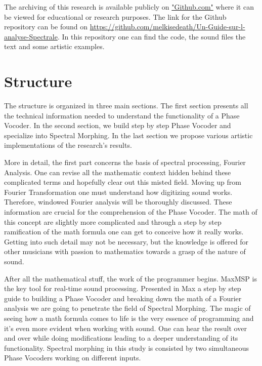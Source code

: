 The archiving of this research is available publicly on \href{https://github.com/}{"Github.com"} where it can be viewed for educational or research purposes. The link for the Github repository can be found on \href{https://github.com/melkisedeath/Un-Guide-sur-l-analyse-Spectrale}{https://github.com/melkisedeath/Un-Guide-sur-l-analyse-Spectrale}. In this repository one can find the code, the sound files the text and some artistic examples.


\section{Structure}

The structure is organized in three main sections. The first section presents all the technical information needed to understand the functionality of a Phase Vocoder. In the second section, we build step by step Phase Vocoder and specialize into Spectral Morphing. In the last section we propose various artistic implementations of the research's results.

More in detail, the first part concerns the basis of spectral processing, Fourier Analysis. One can revise all the mathematic context hidden behind these complicated terms and hopefully clear out this misted field. Moving up from Fourier Transformation one must understand how digitizing sound works. Therefore, windowed Fourier analysis will be thoroughly discussed. These information are crucial for the comprehension of the Phase Vocoder. The math of this concept are slightly more complicated and through a step by step ramification of the math formula one can get to conceive how it really works. Getting into such detail may not be necessary, but the knowledge is offered for other musicians with passion to mathematics towards a grasp of the nature of sound.

After all the mathematical stuff, the work of the programmer begins. MaxMSP is the key tool for real-time sound processing. Presented in Max a step by step guide to building a Phase Vocoder and breaking down the math of a Fourier analysis we are going to penetrate the field of Spectral Morphing. The magic of seeing how a math formula comes to life is the very essence of programming and it's even more evident when working with sound. One can hear the result over and over while doing modifications leading to a deeper understanding of its functionality. Spectral morphing in this study is consisted by two simultaneous Phase Vocoders working on different inputs.


